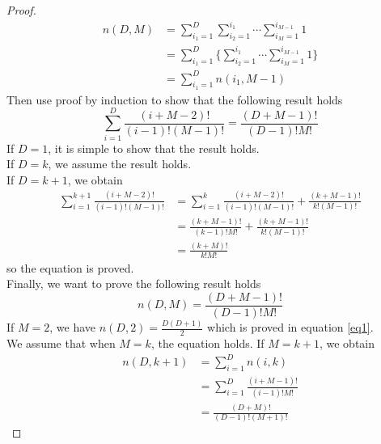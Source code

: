 \documentclass[12pt]{article}
\newenvironment{exercise}[2][Ex]{\begin{trivlist}
\item[\hskip \labelsep {\bfseries #1}\hskip \labelsep {\bfseries #2.}]}{\end{trivlist}}
\begin{document}
\begin{exercise}{1.15(***)}
    \begin{proof}
        \begin{align*}
            n(D,M)&=\sum_{i_1=1}^D\sum_{i_2=1}^{i_1}\cdots\sum_{i_M=1}^{i_{M-1}}1\\
            &=\sum_{i_1=1}^D\{\sum_{i_2=1}^{i_1}\cdots\sum_{i_M=1}^{i_{M-1}}1\}\\
            &=\sum_{i_1=1}^Dn(i_1,M-1)
        \end{align*}
        Then use proof by induction to show that the following result holds
        \[
            \sum_{i=1}^D\frac{(i+M-2)!}{(i-1)!(M-1)!}=\frac{(D+M-1)!}{(D-1)!M!}
            \]
        If $D=1$, it is simple to show that the result holds.\\
        If $D=k$, we assume the result holds.\\
        If $D=k+1$, we obtain
        \begin{align*}
            \sum_{i=1}^{k+1}\frac{(i+M-2)!}{(i-1)!(M-1)!}&=\sum_{i=1}^k\frac{(i+M-2)!}
            {(i-1)!(M-1)!}+\frac{(k+M-1)!}{k!(M-1)!}\\
            &=\frac{(k+M-1)!}{(k-1)!M!}+\frac{(k+M-1)!}{k!(M-1)!}\\
            &=\frac{(k+M)!}{k!M!}
        \end{align*}
        so the equation is proved.\\
        Finally, we want to prove the following result holds
        \[
            n(D,M)=\frac{(D+M-1)!}{(D-1)!M!}
            \]
        If $M=2$, we have $n(D,2)=\frac{D(D+1)}{2}$ which is proved in equation \ref{eq1}.\\
        We assume that when $M=k$, the equation holds.
        If $M=k+1$, we obtain
        \begin{align*}
            n(D,k+1)&=\sum_{i=1}^Dn(i,k)\\
            &=\sum_{i=1}^D\frac{(i+M-1)!}{(i-1)!M!}\\
            &=\frac{(D+M)!}{(D-1)!(M+1)!}
        \end{align*}
    \end{proof}
\end{exercise}
\end{document}

